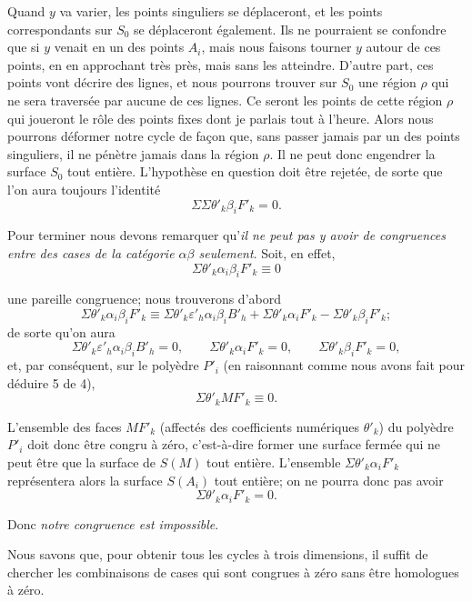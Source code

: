 \documentclass{article}
\begin{document}
Quand $y$ va varier, les points singuliers se déplaceront, et les points correspondants sur $S_{0}$ se déplaceront également. Ils ne pourraient se confondre que si $y$ venait en un des points $A_{i}$, mais nous faisons tourner $y$ autour de ces points, en en approchant très près, mais sans les atteindre. D'autre part, ces points vont décrire des lignes, et nous pourrons trouver sur $S_{0}$ une région $\rho$ qui ne sera traversée par aucune de ces lignes. Ce seront les points de cette région $\rho$ qui joueront le rôle des points fixes dont je parlais tout à l'heure. Alors nous pourrons déformer notre cycle de façon que, sans passer jamais par un des points singuliers, il ne pénètre jamais dans la région $\rho$. Il ne peut donc engendrer la surface $S_{0}$ tout entière. L'hypothèse en question doit être rejetée, de sorte que l'on aura toujours l'identité
\[ \Sigma \Sigma \theta'_{k} \beta_{i}F'_{k} = 0. \tag{9} \]

Pour terminer nous devons remarquer qu'\emph{il ne peut pas y avoir de congruences entre des cases de la catégorie $\alpha\beta$ seulement}. Soit, en effet,
\[ \Sigma \theta'_{k} \alpha_{i}\beta_{i}F'_{k} \equiv 0 \]

une pareille congruence; nous trouverons d'abord
\[ \Sigma \theta'_{k} \alpha_{i}\beta_{i}F'_{k} \equiv \Sigma \theta'_{k} \varepsilon'_{h} \alpha_{i}\beta_{i}B'_{h} + \Sigma \theta'_{k} \alpha_{i}F'_{k} - \Sigma \theta'_{k} \beta_{i}F'_{k}; \]
de sorte qu'on aura
\[ \Sigma \theta'_{k} \varepsilon'_{h} \alpha_{i}\beta_{i}B'_{h} = 0, \qquad \Sigma \theta'_{k} \alpha_{i}F'_{k} = 0, \qquad \Sigma \theta'_{k} \beta_{i}F'_{k} = 0, \]
et, par conséquent, sur le polyèdre $P'_{i}$ (en raisonnant comme nous avons fait pour déduire 5 de 4),
\[ \Sigma \theta'_{k} MF'_{k} \equiv 0. \]

L'ensemble des faces $MF'_{k}$ (affectés des coefficients numériques $\theta'_{k}$) du polyèdre $P'_{i}$ doit donc être congru à zéro, c'est-à-dire former une surface fermée qui ne peut être que la surface de $S(M)$ tout entière. L'ensemble $\Sigma \theta'_{k} \alpha_{i}F'_{k}$ représentera alors la surface $S(A_{i})$ tout entière; on ne pourra donc pas avoir
\[ \Sigma \theta'_{k} \alpha_{i}F'_{k} = 0. \]

Donc \emph{notre congruence est impossible}.

Nous savons que, pour obtenir tous les cycles à trois dimensions, il suffit de chercher les combinaisons de cases qui sont congrues à zéro sans être homologues à zéro.
\end{document}
